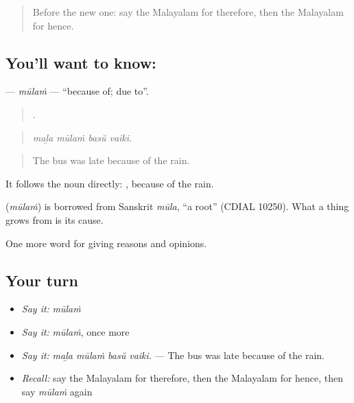 \label{lesson:ML-C411-mulam}



\begin{quote}
Before the new one: say the Malayalam for therefore, then the Malayalam for hence.
\end{quote}

\subsection*{You'll want to know: }
\textbf{} — \emph{mūlaṁ} — \textquotedblleft{}because of; due to\textquotedblright{}.

\begin{quote}
   .
\end{quote}

\begin{quote}
\emph{maḻa mūlaṁ basŭ vaiki.}
\end{quote}

\begin{quote}
The bus was late because of the rain.
\end{quote}

It follows the noun directly:  , because of the rain.

\begin{cousinweb}
\textbf{} (\emph{mūlaṁ}) is borrowed from Sanskrit \emph{mūla}, \textquotedblleft{}a root\textquotedblright{} (CDIAL 10250). What a thing grows from is its cause.
\end{cousinweb}

\begin{grammarlens}[title={What you've built}]
One more word for giving reasons and opinions.
\end{grammarlens}

\subsection*{Your turn}
\begin{itemize}
\raggedright
  \item \emph{Say it:} \emph{mūlaṁ}
  \item \emph{Say it:} \emph{mūlaṁ}, once more
  \item \emph{Say it:} \emph{maḻa mūlaṁ basŭ vaiki.} — The bus was late because of the rain.
  \item \emph{Recall:} say the Malayalam for therefore, then the Malayalam for hence, then say \emph{mūlaṁ} again
\end{itemize}

